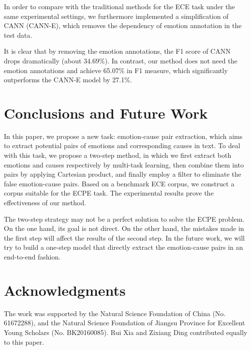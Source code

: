 \documentclass[11pt,a4paper]{article}
\begin{document}
In order to compare with the traditional methods for the ECE task under the same experimental settings, we furthermore implemented a simplification of CANN (CANN-E), which removes the dependency of emotion annotation in the test data. 

It is clear that by removing the emotion annotations, the F1 score of CANN drops dramatically (about 34.69\%). In contrast, our method does not need the emotion annotations and achieve 65.07\% in F1 measure, which significantly outperforms the CANN-E model by 27.1\%.


\section{Conclusions and Future Work}
In this paper, we propose a new task: emotion-cause pair extraction, which aims to extract potential pairs of emotions and corresponding causes in text. To deal with this task, we propose a two-step method, in which we first extract both emotions and causes respectively by multi-task learning, then combine them into pairs by applying Cartesian product, and finally employ a filter to eliminate the false emotion-cause pairs. Based on a benchmark ECE corpus, we construct a corpus suitable for the ECPE task. The experimental results prove the effectiveness of our method. 

The two-step strategy may not be a perfect solution to solve the ECPE problem. On the one hand, its goal is not direct. On the other hand, the mistakes made in the first step will affect the results of the second step. In the future work, we will try to build a one-step model that directly extract the emotion-cause pairs in an end-to-end fashion.

\section*{Acknowledgments}
\noindent The work was supported by the Natural Science Foundation of China (No. 61672288), and the Natural Science Foundation of Jiangsu Province for Excellent Young Scholars (No. BK20160085). Rui Xia and Zixiang Ding contributed equally to this paper.



\end{document}

